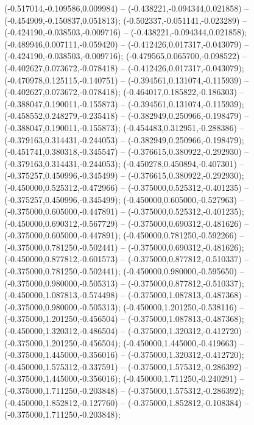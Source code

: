 (-0.517014,-0.109586,0.009984) -- (-0.438221,-0.094344,0.021858) -- (-0.454909,-0.150837,0.051813);
 (-0.502337,-0.051141,-0.023289) -- (-0.424190,-0.038503,-0.009716) -- (-0.438221,-0.094344,0.021858);
 (-0.489946,0.007111,-0.059420) -- (-0.412426,0.017317,-0.043079) -- (-0.424190,-0.038503,-0.009716);
 (-0.479565,0.065700,-0.098522) -- (-0.402627,0.073672,-0.078418) -- (-0.412426,0.017317,-0.043079);
 (-0.470978,0.125115,-0.140751) -- (-0.394561,0.131074,-0.115939) -- (-0.402627,0.073672,-0.078418);
 (-0.464017,0.185822,-0.186303) -- (-0.388047,0.190011,-0.155873) -- (-0.394561,0.131074,-0.115939);
 (-0.458552,0.248279,-0.235418) -- (-0.382949,0.250966,-0.198479) -- (-0.388047,0.190011,-0.155873);
 (-0.454483,0.312951,-0.288386) -- (-0.379163,0.314431,-0.244053) -- (-0.382949,0.250966,-0.198479);
 (-0.451741,0.380318,-0.345547) -- (-0.376615,0.380922,-0.292930) -- (-0.379163,0.314431,-0.244053);
 (-0.450278,0.450894,-0.407301) -- (-0.375257,0.450996,-0.345499) -- (-0.376615,0.380922,-0.292930);
 (-0.450000,0.525312,-0.472966) -- (-0.375000,0.525312,-0.401235) -- (-0.375257,0.450996,-0.345499);
 (-0.450000,0.605000,-0.527963) -- (-0.375000,0.605000,-0.447891) -- (-0.375000,0.525312,-0.401235);
 (-0.450000,0.690312,-0.567729) -- (-0.375000,0.690312,-0.481626) -- (-0.375000,0.605000,-0.447891);
 (-0.450000,0.781250,-0.592266) -- (-0.375000,0.781250,-0.502441) -- (-0.375000,0.690312,-0.481626);
 (-0.450000,0.877812,-0.601573) -- (-0.375000,0.877812,-0.510337) -- (-0.375000,0.781250,-0.502441);
 (-0.450000,0.980000,-0.595650) -- (-0.375000,0.980000,-0.505313) -- (-0.375000,0.877812,-0.510337);
 (-0.450000,1.087813,-0.574498) -- (-0.375000,1.087813,-0.487368) -- (-0.375000,0.980000,-0.505313);
 (-0.450000,1.201250,-0.538116) -- (-0.375000,1.201250,-0.456504) -- (-0.375000,1.087813,-0.487368);
 (-0.450000,1.320312,-0.486504) -- (-0.375000,1.320312,-0.412720) -- (-0.375000,1.201250,-0.456504);
 (-0.450000,1.445000,-0.419663) -- (-0.375000,1.445000,-0.356016) -- (-0.375000,1.320312,-0.412720);
 (-0.450000,1.575312,-0.337591) -- (-0.375000,1.575312,-0.286392) -- (-0.375000,1.445000,-0.356016);
 (-0.450000,1.711250,-0.240291) -- (-0.375000,1.711250,-0.203848) -- (-0.375000,1.575312,-0.286392);
 (-0.450000,1.852812,-0.127760) -- (-0.375000,1.852812,-0.108384) -- (-0.375000,1.711250,-0.203848);
